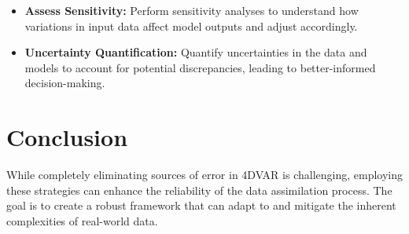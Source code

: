 \documentclass{article}
\begin{document}
\begin{itemize}
    \item \textbf{Assess Sensitivity:} Perform sensitivity analyses to understand how variations in input data affect model outputs and adjust accordingly.
    
    \item \textbf{Uncertainty Quantification:} Quantify uncertainties in the data and models to account for potential discrepancies, leading to better-informed decision-making.
\end{itemize}

\section{Conclusion}

While completely eliminating sources of error in 4DVAR is challenging, employing these strategies can enhance the reliability of the data assimilation process. The goal is to create a robust framework that can adapt to and mitigate the inherent complexities of real-world data.
\end{document}
